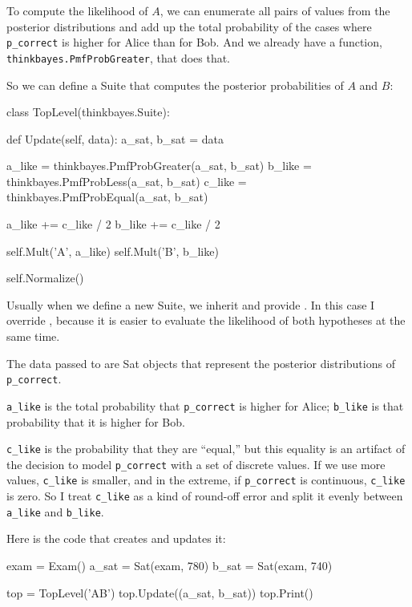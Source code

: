 \documentclass[12pt]{book}
\theoremstyle{exercise}
\begin{document}
To compute the likelihood of $A$, we can enumerate all pairs of values
from the posterior distributions and add up the total probability of
the cases where \verb"p_correct" is higher for Alice than for Bob.
And we already have a function, \verb"thinkbayes.PmfProbGreater",
that does that.

So we can define a Suite that computes the posterior probabilities
of $A$ and $B$:

\begin{code}
class TopLevel(thinkbayes.Suite):

    def Update(self, data):
        a_sat, b_sat = data

        a_like = thinkbayes.PmfProbGreater(a_sat, b_sat)
        b_like = thinkbayes.PmfProbLess(a_sat, b_sat)
        c_like = thinkbayes.PmfProbEqual(a_sat, b_sat)

        a_like += c_like / 2
        b_like += c_like / 2

        self.Mult('A', a_like)
        self.Mult('B', b_like)

        self.Normalize()
\end{code}

Usually when we define a new Suite, we inherit 
and provide .  In this case I override ,
because it is easier to evaluate the likelihood of both
hypotheses at the same time.

The data passed to  are Sat objects that represent
the posterior distributions of \verb"p_correct".

\verb"a_like" is the total probability that
\verb"p_correct" is higher for Alice; \verb"b_like" is that
probability that it is higher for Bob.

\verb"c_like" is the probability that they are ``equal,'' but this
equality is an artifact of the decision to model \verb"p_correct" with
a set of discrete values.  If we use more values, \verb"c_like"
is smaller, and in the extreme, if \verb"p_correct" is
continuous, \verb"c_like" is zero.  So I treat \verb"c_like" as
a kind of round-off error and split it evenly between \verb"a_like"
and \verb"b_like".

Here is the code that creates  and updates it:

\begin{code}
    exam = Exam()
    a_sat = Sat(exam, 780)
    b_sat = Sat(exam, 740)

    top = TopLevel('AB')
    top.Update((a_sat, b_sat))
    top.Print()
\end{code}
\end{document}
